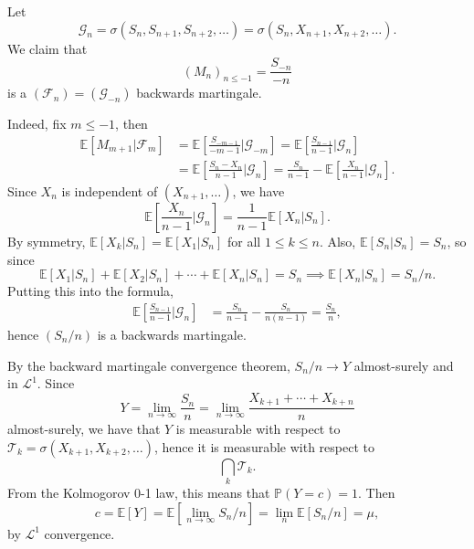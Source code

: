 \documentclass[12pt]{article}
\begin{document}
\begin{proofbox}
	Let 
	\[
	\mathcal{G}_n = \sigma(S_n, S_{n+1}, S_{n+2}, \ldots) = \sigma(S_n, X_{n+1}, X_{n+2}, \ldots).
	\]
	We claim that
	\[
		(M_n)_{n \leq -1} = \frac{S_{-n}}{-n}
	\]
	is a $(\mathcal{F}_n) = (\mathcal{G}_{-n})$ backwards martingale.

	Indeed, fix $m \leq -1$, then
	\begin{align*}
		\mathbb{E}[M_{m + 1} | \mathcal{F}_m] &= \mathbb{E}\left[ \frac{S_{-m-1}}{-m-1} | \mathcal{G}_{-m} \right] = \mathbb{E}\left[ \frac{S_{n-1}}{n-1} | \mathcal{G}_n \right] \\
						    &= \mathbb{E}\left[ \frac{S_n - X_n}{n-1} | \mathcal{G}_n \right] = \frac{S_n}{n-1} - \mathbb{E}\left[ \frac{X_n}{n-1} | \mathcal{G}_n \right].
	\end{align*}
	Since $X_n$ is independent of $(X_{n+1}, \ldots)$, we have
	\[
	\mathbb{E}\left[ \frac{X_n}{n-1} | \mathcal{G}_n \right] = \frac{1}{n-1} \mathbb{E}[X_n | S_n].
	\]
	By symmetry, $\mathbb{E}[X_k | S_n] = \mathbb{E}[X_1 | S_n]$ for all $1 \leq k \leq n$. Also, $\mathbb{E}[S_n | S_n] = S_n$, so since
	\[
	\mathbb{E}[X_1 | S_n] + \mathbb{E}[X_2 | S_n] + \cdots + \mathbb{E}[X_n | S_n] = S_n \implies \mathbb{E}[X_n | S_n] = S_n/n.
	\]
	Putting this into the formula,
	\begin{align*}
		\mathbb{E}\left[\frac{S_{n-1}}{n-1} | \mathcal{G}_n \right] &= \frac{S_n}{n-1} - \frac{S_n}{n(n-1)} = \frac{S_n}{n},
	\end{align*}
	hence $(S_n/n)$ is a backwards martingale.

	By the backward martingale convergence theorem, $S_n/n \to Y$ almost-surely and in $\mathcal{L}^1$. Since
	\[
	Y = \lim_{n \to \infty} \frac{S_n}{n} = \lim_{n \to \infty} \frac{X_{k+1} + \cdots + X_{k+n}}{n}
	\]
	almost-surely, we have that $Y$ is measurable with respect to $\mathcal{T}_k = \sigma(X_{k+1}, X_{k+2}, \ldots)$, hence it is measurable with respect to
	\[
	\bigcap_{k} \mathcal{T}_k.
	\]
	From the Kolmogorov 0-1 law, this means that $\mathbb{P}(Y = c) = 1$. Then
	\[
	c = \mathbb{E}[Y] = \mathbb{E}[\lim_{n \to \infty} S_n/n] = \lim_{n} \mathbb{E}[S_n/n] = \mu,
	\]
	by $\mathcal{L}^1$ convergence.
\end{proofbox}
\end{document}

